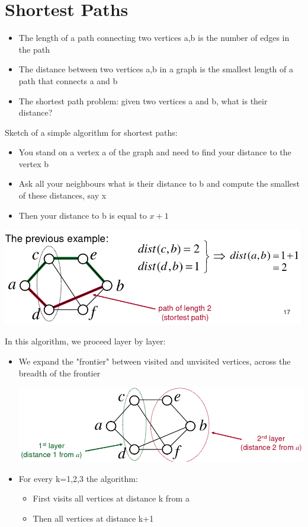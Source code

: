 \documentclass{article}[18pt]
\begin{document}
\section{Shortest Paths}
\begin{itemize}
	\item The length of a path connecting two vertices a,b is the number of edges in the path
	\item The distance between two vertices a,b in a graph is the smallest length of a path that connects a and b
	\item The shortest path problem: given two vertices a and b, what is their distance?
\end{itemize}
Sketch of a simple algorithm for shortest paths:
\begin{itemize}
	\item You stand on a vertex a of the graph and need to find your distance to the vertex b
	\item Ask all your neighbours what is their distance to b and compute the smallest of these distances, say x
	\item Then your distance to b is equal to $x+1$
\end{itemize}
\begin{center}
	\includegraphics[scale=0.7]{Shortest}
\end{center}
In this algorithm, we proceed layer by layer:
\begin{itemize}
	\item We expand the "frontier" between visited and unvisited vertices, across the breadth of the frontier
	\begin{center}
		\includegraphics[scale=0.7]{Shortest1}
	\end{center}
	\item For every k=1,2,3 the algorithm:
	\begin{itemize}
		\item First visits all vertices at distance k from a
		\item Then all vertices at distance k+1
	\end{itemize}
\end{itemize}
\end{document}
